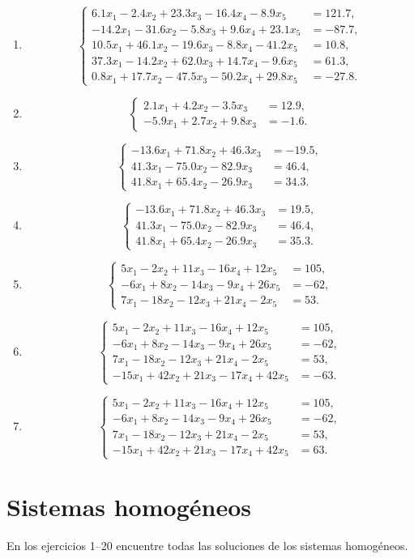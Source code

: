 \documentclass[12pt]{article}
\newcommand{\sistema}[1]{%
\[
\left\{
\begin{aligned}
#1
\end{aligned}
\right.
\]
}
\begin{document}
\begin{enumerate}[label=\textbf{\arabic*.},start=55,leftmargin=*]
\item \sistema{
6.1x_1-2.4x_2+23.3x_3-16.4x_4-8.9x_5&=121.7,\\
-14.2x_1-31.6x_2-5.8x_3+9.6x_4+23.1x_5&=-87.7,\\
10.5x_1+46.1x_2-19.6x_3-8.8x_4-41.2x_5&=10.8,\\
37.3x_1-14.2x_2+62.0x_3+14.7x_4-9.6x_5&=61.3,\\
0.8x_1+17.7x_2-47.5x_3-50.2x_4+29.8x_5&=-27.8.
}

\item \sistema{
2.1x_1+4.2x_2-3.5x_3&=12.9,\\
-5.9x_1+2.7x_2+9.8x_3&=-1.6.
}

\item \sistema{
-13.6x_1+71.8x_2+46.3x_3&=-19.5,\\
41.3x_1-75.0x_2-82.9x_3&=46.4,\\
41.8x_1+65.4x_2-26.9x_3&=34.3.
}

\item \sistema{
-13.6x_1+71.8x_2+46.3x_3&=19.5,\\
41.3x_1-75.0x_2-82.9x_3&=46.4,\\
41.8x_1+65.4x_2-26.9x_3&=35.3.
}

\item \sistema{
5x_1-2x_2+11x_3-16x_4+12x_5&=105,\\
-6x_1+8x_2-14x_3-9x_4+26x_5&=-62,\\
7x_1-18x_2-12x_3+21x_4-2x_5&=53.
}

\item \sistema{
5x_1-2x_2+11x_3-16x_4+12x_5&=105,\\
-6x_1+8x_2-14x_3-9x_4+26x_5&=-62,\\
7x_1-18x_2-12x_3+21x_4-2x_5&=53,\\
-15x_1+42x_2+21x_3-17x_4+42x_5&=-63.
}

\item \sistema{
5x_1-2x_2+11x_3-16x_4+12x_5&=105,\\
-6x_1+8x_2-14x_3-9x_4+26x_5&=-62,\\
7x_1-18x_2-12x_3+21x_4-2x_5&=53,\\
-15x_1+42x_2+21x_3-17x_4+42x_5&=63.
}

\end{enumerate}

\section{Sistemas homogéneos}

En los ejercicios 1--20 encuentre todas las soluciones de los sistemas homogéneos.
\end{document}
